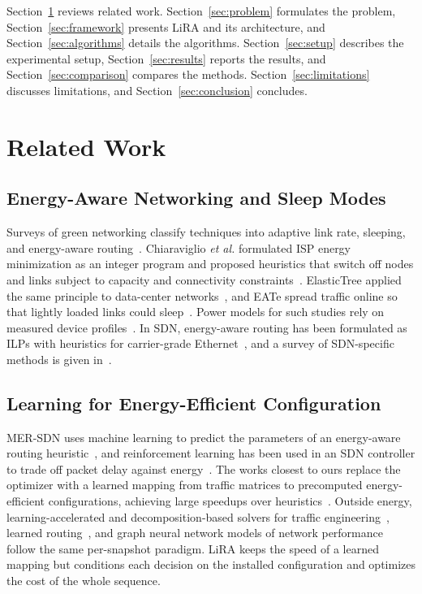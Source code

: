 \documentclass[conference]{IEEEtran}
\begin{document}
Section~\ref{sec:related} reviews related work. Section~\ref{sec:problem} formulates the problem, Section~\ref{sec:framework} presents LiRA and its architecture, and Section~\ref{sec:algorithms} details the algorithms. Section~\ref{sec:setup} describes the experimental setup, Section~\ref{sec:results} reports the results, and Section~\ref{sec:comparison} compares the methods. Section~\ref{sec:limitations} discusses limitations, and Section~\ref{sec:conclusion} concludes.

\section{Related Work}\label{sec:related}

\subsection{Energy-Aware Networking and Sleep Modes}

Surveys of green networking classify techniques into adaptive link rate, sleeping, and energy-aware routing~\cite{bianzino2012survey,bolla2011energy}. Chiaraviglio \emph{et al.} formulated ISP energy minimization as an integer program and proposed heuristics that switch off nodes and links subject to capacity and connectivity constraints~\cite{chiaraviglio2012minimizing}. ElasticTree applied the same principle to data-center networks~\cite{heller2010elastictree}, and EATe spread traffic online so that lightly loaded links could sleep~\cite{vasic2010eate}. Power models for such studies rely on measured device profiles~\cite{mahadevan2009power,restrepo2009energy}. In SDN, energy-aware routing has been formulated as ILPs with heuristics for carrier-grade Ethernet~\cite{maaloul2018carrier}, and a survey of SDN-specific methods is given in~\cite{assefa2019survey}.

\subsection{Learning for Energy-Efficient Configuration}

MER-SDN uses machine learning to predict the parameters of an energy-aware routing heuristic~\cite{assefa2018mersdn}, and reinforcement learning has been used in an SDN controller to trade off packet delay against energy~\cite{frohlich2021rl}. The works closest to ours replace the optimizer with a learned mapping from traffic matrices to precomputed energy-efficient configurations, achieving large speedups over heuristics~\cite{gomezdelahiz2025noms,gomezdelahiz2026tgcn}. Outside energy, learning-accelerated and decomposition-based solvers for traffic engineering~\cite{xu2023teal,perry2023dote,abuzaid2021ncflow,narayanan2021pop}, learned routing~\cite{valadarsky2017learning}, and graph neural network models of network performance~\cite{rusek2020routenet} follow the same per-snapshot paradigm. LiRA keeps the speed of a learned mapping but conditions each decision on the installed configuration and optimizes the cost of the whole sequence.
\end{document}
